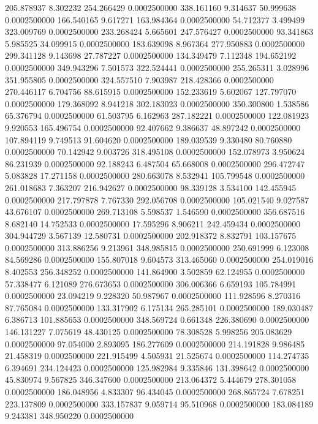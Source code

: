 205.878937 8.302232 254.266429 0.0002500000
338.161160 9.314637 50.999638 0.0002500000
166.540165 9.617271 163.984364 0.0002500000
54.712377 3.499499 323.009769 0.0002500000
233.268424 5.665601 247.576427 0.0002500000
93.341863 5.985525 34.099915 0.0002500000
183.639098 8.967364 277.950883 0.0002500000
299.341128 9.143698 27.787227 0.0002500000
134.349479 7.112348 194.652192 0.0002500000
349.943296 7.501573 322.524441 0.0002500000
255.265311 3.028996 351.955805 0.0002500000
324.557510 7.903987 218.428366 0.0002500000
270.446117 6.704756 88.615915 0.0002500000
152.233619 5.602067 127.797070 0.0002500000
179.368092 8.941218 302.183023 0.0002500000
350.300800 1.538586 65.376794 0.0002500000
61.503795 6.162963 287.182221 0.0002500000
122.081923 9.920553 165.496754 0.0002500000
92.407662 9.386637 48.897242 0.0002500000
107.894119 9.749513 91.604620 0.0002500000
189.039539 9.330480 80.760880 0.0002500000
70.142942 9.003726 318.495108 0.0002500000
152.078973 3.950624 86.231939 0.0002500000
92.188243 6.487504 65.668008 0.0002500000
296.472747 5.083828 17.271158 0.0002500000
280.663078 8.532941 105.799548 0.0002500000
261.018683 7.363207 216.942627 0.0002500000
98.339128 3.534100 142.455945 0.0002500000
217.797878 7.767330 292.056708 0.0002500000
105.021540 9.027587 43.676107 0.0002500000
269.713108 5.598537 1.546590 0.0002500000
356.687516 8.682140 14.752533 0.0002500000
17.595296 8.906211 242.459434 0.0002500000
304.944729 3.567139 12.580731 0.0002500000
202.918372 8.832791 103.157675 0.0002500000
313.886256 9.213961 348.985815 0.0002500000
250.691999 6.123008 84.569286 0.0002500000
155.807018 9.604573 313.465060 0.0002500000
254.019016 8.402553 256.348252 0.0002500000
141.864900 3.502859 62.124955 0.0002500000
57.338477 6.121089 276.673653 0.0002500000
306.006366 6.659193 105.784991 0.0002500000
23.094219 9.228320 50.987967 0.0002500000
111.928596 8.270316 87.765084 0.0002500000
133.317902 6.175134 265.285101 0.0002500000
189.030487 6.386713 101.885653 0.0002500000
348.569724 0.661348 226.380690 0.0002500000
146.131227 7.075619 48.430125 0.0002500000
78.308528 5.998256 205.083629 0.0002500000
97.054000 2.893095 186.277609 0.0002500000
214.191828 9.986485 21.458319 0.0002500000
221.915499 4.505931 21.525674 0.0002500000
114.274735 6.394691 234.124423 0.0002500000
125.982984 9.335846 131.398642 0.0002500000
45.830974 9.567825 346.347600 0.0002500000
213.064372 5.444679 278.301058 0.0002500000
186.048956 4.833307 96.434045 0.0002500000
268.865724 7.678251 223.137809 0.0002500000
333.157837 9.059714 95.510968 0.0002500000
183.084189 9.243381 348.950220 0.0002500000
